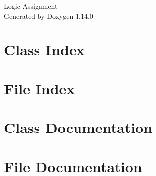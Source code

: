 \documentclass[twoside]{book}
\newcommand{\+}{\discretionary{\mbox{\scriptsize$\hookleftarrow$}}{}{}}
\newcommand{\clearemptydoublepage}{%
    \newpage{\pagestyle{empty}\cleardoublepage}%
  }
\begin{document}
  \raggedbottom
    \hypersetup{pageanchor=false,
                bookmarksnumbered=true,
                pdfencoding=unicode
               }
  \begin{titlepage}
  \vspace*{7cm}
  \begin{center}%
  {\Large Logic Assignment}\\
  \vspace*{1cm}
  {\large Generated by Doxygen 1.14.0}\\
  \end{center}
  \end{titlepage}
  \clearemptydoublepage
  \tableofcontents
  \clearemptydoublepage
  \hypersetup{pageanchor=true}
\chapter{Class Index}

\chapter{File Index}

\chapter{Class Documentation}

\chapter{File Documentation}








  \backmatter
  \newpage
  \clearemptydoublepage
  \printindex
\end{document}
